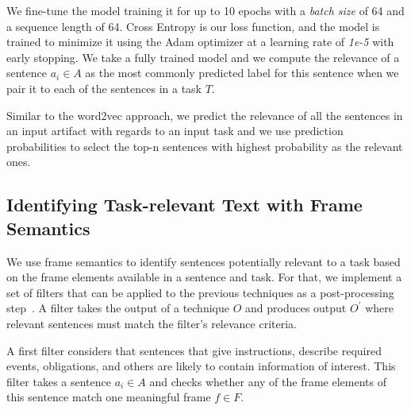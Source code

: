 We fine-tune the model training it for up to 10 epochs with a \textit{batch size} of 64 and a sequence length of 64. Cross Entropy is our loss function, and the model is trained to minimize it using the Adam optimizer at a learning rate of \textit{1e-5} with early stopping. 
We take a fully trained model and we compute the relevance of a sentence $a_i \in A$ as the most commonly predicted label for this sentence when we pair it to each of the sentences in a task $T$.


Similar to the word2vec approach, we predict the relevance of all the sentences in an input artifact with regards to an input task and we use prediction probabilities to select 
the top-n sentences with highest probability as the relevant ones.









\subsection{Identifying Task-relevant Text with Frame Semantics}
\label{cp5:approach-filters}




We use frame semantics to identify sentences potentially relevant to a task based on the frame elements available in a sentence and task. 
For that, we implement a set of filters that can be applied to the previous techniques as a post-processing step~\cite{Manning2009IR}.
A filter takes the output of a technique $O$ and produces output $O^{\prime}$ where relevant sentences must match the filter's relevance criteria.


A first filter considers that sentences that give instructions, describe required events, obligations, and others are likely to contain information of interest. 
This filter takes a sentence $a_i \in A$ and checks whether any of the frame elements of this sentence match one meaningful frame $f \in F$. 





